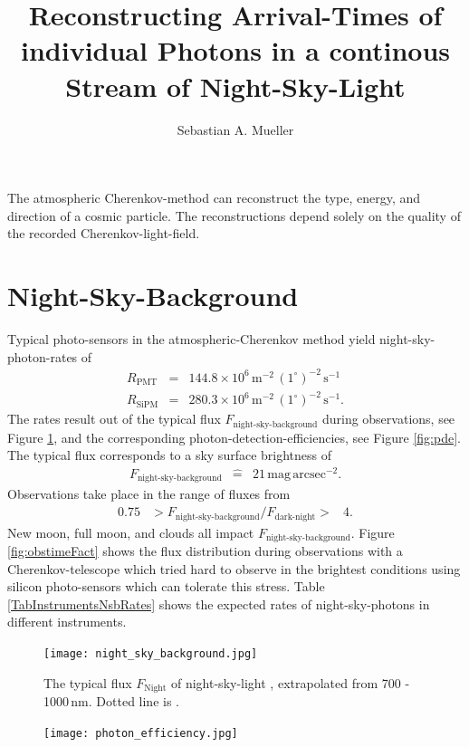 \documentclass{article}%
\title{
    Reconstructing Arrival-Times of individual Photons
    in a continous Stream of Night-Sky-Light
}%
\author{Sebastian A. Mueller}%
\date{}%
\begin{document}
%
\maketitle%

\newcommand{\F}{F_\text{night-sky-background}}
\newcommand{\Ftyp}{F_\text{dark-night}}
\begin{multicols}{2}%
%
The atmospheric Cherenkov-method can reconstruct the type, energy, and direction of a cosmic particle.
%
The reconstructions depend solely on the quality of the recorded Cherenkov-light-field.
%
\section*{Night-Sky-Background}%
\label{sec:nsb}%
%
Typical photo-sensors in the atmospheric-Cherenkov method yield night-sky-photon-rates of
\begin{eqnarray*}
R_\text{PMT} &=& 144.8\times10^6\,\text{m}^{-2}\,(1^\circ)^{-2}\,\text{s}^{-1}\\
R_\text{SiPM} &=& 280.3\times10^6\,\text{m}^{-2}\,(1^\circ)^{-2}\,\text{s}^{-1}.
\end{eqnarray*}
%
The rates result out of the typical flux $\F{}$ during observations, see Figure \ref{fig:nsb}, and the corresponding photon-detection-efficiencies, see Figure \ref{fig:pde}.
%
The typical flux  corresponds to a sky surface brightness of
%
\begin{eqnarray*}
\F{} &\hat{=}& 21\,\text{mag}\,\text{arcsec}^{-2}.
\end{eqnarray*}
%
Observations take place in the range of fluxes from
\begin{eqnarray*}
0.75 &> \F{} / \Ftyp{} >& 4.
\end{eqnarray*}
%
New moon, full moon, and clouds all impact $\F{}$.
%
Figure \ref{fig:obstimeFact} shows the flux distribution during observations with a Cherenkov-telescope which tried hard to observe in the brightest conditions using silicon photo-sensors which can tolerate this stress.
%
Table \ref{TabInstrumentsNsbRates} shows the expected rates of night-sky-photons in different instruments.
%
\begin{figure}[H]%
\centering%
\texttt{[image: night\_sky\_background.jpg]}%
\caption{
The typical flux $F_\text{Night}$ of night-sky-light \cite{benn1987night},
extrapolated from 700 - 1000\,nm. Dotted line is \cite{preuss2002study}.
}%
\label{fig:nsb}
\end{figure}
%
\begin{figure}[H]%
\centering%
\texttt{[image: photon\_efficiency.jpg]}%

\end{figure}
\end{multicols}
\end{document}
